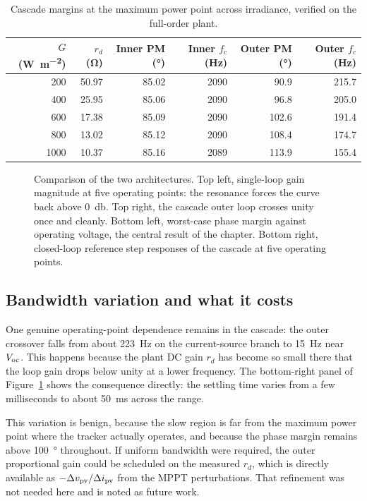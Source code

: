 \begin{table}[htbp]
\centering
\caption{Cascade margins at the maximum power point across irradiance, verified on the full-order plant.}
\label{tab:cascadeG}
\begin{tabular}{@{}rrrrrr@{}}
\toprule
$G$ (\si{\watt\per\square\metre}) & $r_d$ (\si{\ohm}) & Inner PM (\si{\degree}) & Inner $f_c$ (\si{\hertz}) & Outer PM (\si{\degree}) & Outer $f_c$ (\si{\hertz}) \\
\midrule
200  & 50.97 & 85.02 & 2090 & 90.9  & 215.7 \\
400  & 25.95 & 85.06 & 2090 & 96.8  & 205.0 \\
600  & 17.38 & 85.09 & 2090 & 102.6 & 191.4 \\
800  & 13.02 & 85.12 & 2090 & 108.4 & 174.7 \\
1000 & 10.37 & 85.16 & 2089 & 113.9 & 155.4 \\
\bottomrule
\end{tabular}
\end{table}

\begin{figure}[htbp]
\centering
{}
\caption[Control design comparison]{Comparison of the two architectures. Top left, single-loop gain magnitude at five operating points: the resonance forces the curve back above \SI{0}{\decibel}. Top right, the cascade outer loop crosses unity once and cleanly. Bottom left, worst-case phase margin against operating voltage, the central result of the chapter. Bottom right, closed-loop reference step responses of the cascade at five operating points.}
\label{fig:controldesign}
\end{figure}

\subsection{Bandwidth variation and what it costs}

One genuine operating-point dependence remains in the cascade: the outer
crossover falls from about \SI{223}{\hertz} on the current-source branch to
\SI{15}{\hertz} near $V_{\mathrm{oc}}$. This happens because the plant DC gain $r_d$ has
become so small there that the loop gain drops below unity at a lower frequency.
The bottom-right panel of Figure~\ref{fig:controldesign} shows the
consequence directly: the settling time varies from a few milliseconds to about
\SI{50}{\milli\second} across the range.

This variation is benign, because the slow region is far from the maximum power
point where the tracker actually operates, and because the phase margin remains
above \SI{100}{\degree} throughout. If uniform bandwidth were required, the
outer proportional gain could be scheduled on the measured $r_d$, which is
directly available as $-\Delta v_{\mathrm{pv}} / \Delta i_{\mathrm{pv}}$ from the MPPT perturbations.
That refinement was not needed here and is noted as future work.

